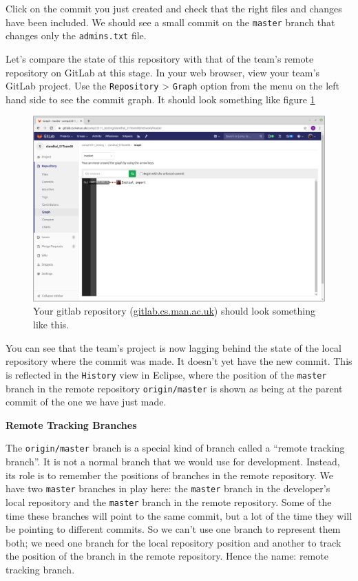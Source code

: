 \documentclass[
]{book}
\begin{document}
Click on the commit you just created and check that the right files and changes have been included. We should see a small commit on the \texttt{master} branch that changes only the \texttt{admins.txt} file.

Let's compare the state of this repository with that of the team's remote repository on GitLab at this stage. In your web browser, view your team's GitLab project. Use the \texttt{Repository} \textgreater{} \texttt{Graph} option from the menu on the left hand side to see the commit graph. It should look something like figure \ref{fig:commitGraphInGitLabBeforePushNoHistory-fig}

\begin{figure}

{\centering \includegraphics[width=1\linewidth]{images/commitGraphInGitLabBeforePushNoHistory} 

}

\caption{Your gitlab repository (\href{https://gitlab.cs.man.ac.uk}{gitlab.cs.man.ac.uk}) should look something like this.}\label{fig:commitGraphInGitLabBeforePushNoHistory-fig}
\end{figure}



You can see that the team's project is now lagging behind the state of the local repository where the commit was made. It doesn't yet have the new commit. This is reflected in the \texttt{History} view in Eclipse, where the position of the \texttt{master} branch in the remote repository \texttt{origin/master} is shown as being at the parent commit of the one we have just made.

\textbf{Remote Tracking Branches}

The \texttt{origin/master} branch is a special kind of branch called a ``remote tracking branch''. It is not a normal branch that we would use for development. Instead, its role is to remember the positions of branches in the remote repository. We have two \texttt{master} branches in play here: the \texttt{master} branch in the developer's local repository and the \texttt{master} branch in the remote repository. Some of the time these branches will point to the same commit, but a lot of the time they will be pointing to different commits. So we can't use one branch to represent them both; we need one branch for the local repository position and another to track the position of the branch in the remote repository. Hence the name: remote tracking branch.
\end{document}
